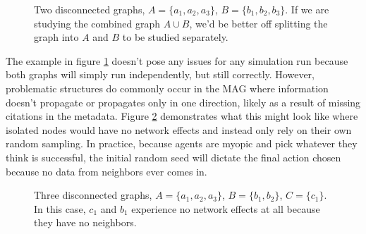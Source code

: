 \begin{figure}
    \centering
    \caption{Two disconnected graphs, $A = \{ a_1, a_2, a_3 \}$, $B = \{ b_1, b_2, b_3 \}$. If we are studying the combined graph $A \cup B$, we'd be better off splitting the graph into $A$ and $B$ to be studied separately.}
    \label{fig:disjoint}
\end{figure}

The example in figure \ref{fig:disjoint} doesn't pose any issues for any
simulation run because both graphs will simply run independently, but
still correctly. However, problematic structures do commonly occur in
the MAG where information doesn't propagate or propagates only in one
direction, likely as a result of missing citations in the metadata.
Figure \ref{fig:isolate} demonstrates what this might look like where
isolated nodes would have no network effects and instead only rely on
their own random sampling. In practice, because agents are myopic and
pick whatever they think is successful, the initial random seed will
dictate the final action chosen because no data from neighbors ever
comes in.

\begin{figure}
    \centering
    \caption{Three disconnected graphs, $A = \{ a_1, a_2, a_3 \}$, $B = \{ b_1, b_2\}$, $C = \{c_1\}$. In this case, $c_1$ and $b_1$ experience no network effects at all because they have no neighbors.}
    \label{fig:isolate}
\end{figure}


